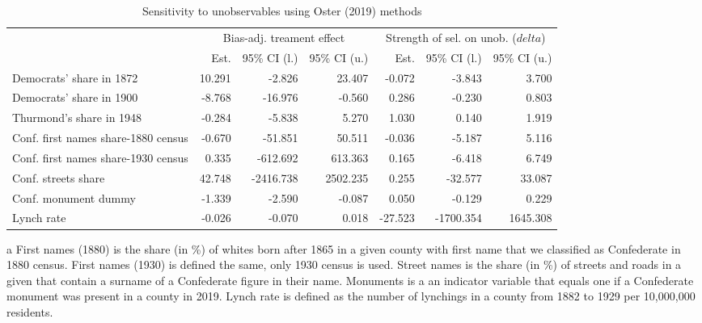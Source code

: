 \begin{table}[h]

\begin{threeparttable}
\caption{\label{tab:oster_2019}Sensitivity to unobservables using Oster (2019) methods}
\centering
\begin{tabular}[t]{lrrrrrr}
\toprule
\multicolumn{1}{c}{ } & \multicolumn{3}{c}{Bias-adj. treament effect} & \multicolumn{3}{c}{Strength of sel. on unob. ($delta$)} \\
\cmidrule(l{3pt}r{3pt}){2-4} \cmidrule(l{3pt}r{3pt}){5-7}
  & Est.  & 95\% CI (l.) & 95\% CI (u.) & Est. & 95\% CI (l.)  & 95\% CI (u.) \\
\midrule
Democrats' share in 1872 & 10.291 & -2.826 & 23.407 & -0.072 & -3.843 & 3.700\\
Democrats' share in 1900 & -8.768 & -16.976 & -0.560 & 0.286 & -0.230 & 0.803\\
Thurmond's share in 1948 & -0.284 & -5.838 & 5.270 & 1.030 & 0.140 & 1.919\\
Conf. first names share-1880 census & -0.670 & -51.851 & 50.511 & -0.036 & -5.187 & 5.116\\
Conf. first names share-1930 census & 0.335 & -612.692 & 613.363 & 0.165 & -6.418 & 6.749\\
\addlinespace
Conf. streets share & 42.748 & -2416.738 & 2502.235 & 0.255 & -32.577 & 33.087\\
Conf. monument dummy & -1.339 & -2.590 & -0.087 & 0.050 & -0.129 & 0.229\\
Lynch rate & -0.026 & -0.070 & 0.018 & -27.523 & -1700.354 & 1645.308\\
\bottomrule
\end{tabular}
\begin{tablenotes}
\small
\item [a] First names (1880)	is the share (in \%) of whites born after 1865 in a given county with first name that we classified as Confederate in 1880 census. First names (1930) is defined the same, only 1930 census is used. Street names is the share (in \%) of streets and roads in a given that contain a surname of a Confederate figure in their name. Monuments is a an indicator variable that equals one if a Confederate monument was present in a county in 2019. Lynch rate is defined as the number of lynchings in a county from 1882 to 1929 per  10,000,000 residents.
\end{tablenotes}
\end{threeparttable}
\end{table}
